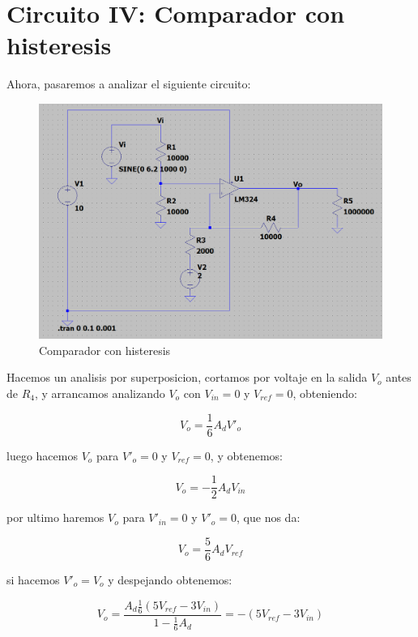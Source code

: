 \documentclass[12pt]{article}
\begin{document}
	\section{Circuito IV: Comparador con histeresis}
	Ahora, pasaremos a analizar el siguiente circuito:
	\begin{figure}[h]
		\centering
		\includegraphics[width=1\linewidth]{Simulaciones-Resultados/Circuito4_esquematico}
		\caption{Comparador con histeresis}
		\label{fig:circuito4esquematico}
	\end{figure}

	Hacemos un analisis por superposicion, cortamos por voltaje en la salida $V_{o}$ antes de $R_{4}$, y arrancamos analizando $V_{o}$ 			con $V_{in} = 0$ y $V_{ref} = 0$, obteniendo:
 	
	\begin{equation}
		V_{o} = \frac{1}{6} A_{d} V'_{o}
	\end{equation}
	
	luego hacemos $V_{o}$ para $V'_{o} = 0$ y $V_{ref} = 0$, y obtenemos:

	\begin{equation}
		V_{o} = -\frac{1}{2} A_{d} V_{in}
	\end{equation}

	por ultimo haremos $V_{o}$ para $V'_{in} = 0$ y $V'_{o} = 0$, que nos da:

	\begin{equation}
		V_{o} = \frac{5}{6} A_{d} V_{ref}
	\end{equation}

	si hacemos $V'_{o} = V_{o}$ y despejando obtenemos:

	\begin{equation}
		V_{o} = \frac{A_{d} \frac{1}{6} (5 V_{ref} - 3 V_{in})}{1 - \frac{1}{6} A_{d}} = - (5 V_{ref} - 3V_{in})
	\end{equation}
\end{document}
